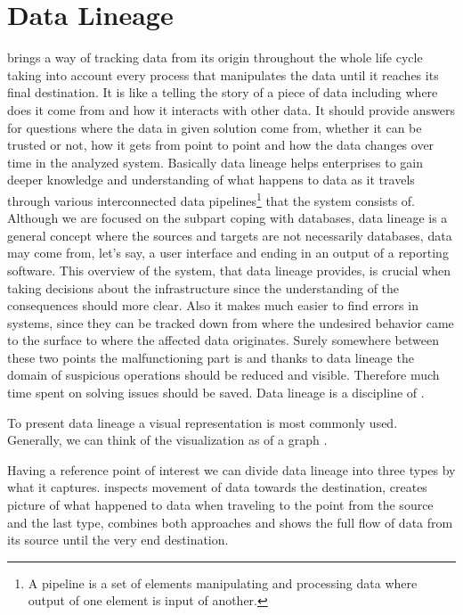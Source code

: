 \chapter{Data Lineage}

 brings a way of tracking data from its origin throughout the whole life cycle taking into account every process that manipulates the data until it reaches its final destination. It is like a telling the story of a piece of data including where does it come from and how it interacts with other data.
It should provide answers for questions where the data in given solution come from, whether it can be trusted or not, how it gets from point to point and how the data changes over time in the analyzed system.
Basically data lineage helps enterprises to gain deeper knowledge and understanding of what happens to data as it travels through various interconnected data pipelines\footnote{A pipeline is a set of elements manipulating and processing data where output of one element is input of another.} that the system consists of. Although we are focused on the subpart coping with databases, data lineage is a general concept where the sources and targets are not necessarily databases, data may come from, let's say, a user interface and ending in an output of a reporting software.
This overview of the system, that data lineage provides, is crucial when taking decisions about the infrastructure since the understanding of the consequences should more clear. Also it makes much easier to find errors in systems, since they can be tracked down from where the undesired behavior came to the surface to where the affected data originates. Surely somewhere between these two points the malfunctioning part is and thanks to data lineage the domain of suspicious operations should be reduced and visible. 
Therefore much time spent on solving issues should be saved.
Data lineage is a discipline of . 

To present data lineage a visual representation is most commonly used. Generally, we can think of the visualization as of a graph .

Having a reference point of interest we can divide data lineage into three types by what it captures.  inspects movement of data towards the destination,  creates picture of what happened to data when traveling to the point from the source and the last type,  combines both approaches and shows the full flow of data from its source until the very end destination.

